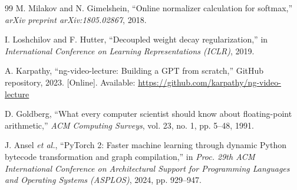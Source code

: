 \documentclass[conference]{IEEEtran}
\begin{document}
\begin{thebibliography}{99}
M. Milakov and N. Gimelshein, ``Online normalizer calculation for softmax,'' \textit{arXiv preprint arXiv:1805.02867}, 2018.

I. Loshchilov and F. Hutter, ``Decoupled weight decay regularization,'' in \textit{International Conference on Learning Representations (ICLR)}, 2019.

A. Karpathy, ``ng-video-lecture: Building a GPT from scratch,'' GitHub repository, 2023. [Online]. Available: \url{https://github.com/karpathy/ng-video-lecture}

D. Goldberg, ``What every computer scientist should know about floating-point arithmetic,'' \textit{ACM Computing Surveys}, vol. 23, no. 1, pp. 5--48, 1991.

J. Ansel \textit{et al.}, ``PyTorch 2: Faster machine learning through dynamic Python bytecode transformation and graph compilation,'' in \textit{Proc. 29th ACM International Conference on Architectural Support for Programming Languages and Operating Systems (ASPLOS)}, 2024, pp. 929--947.
\end{thebibliography}
\end{document}

